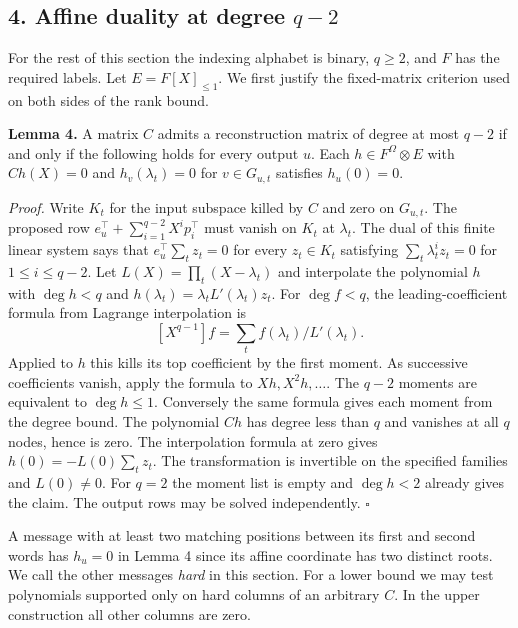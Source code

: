 \documentclass[
  10pt,
]{article}
\begin{document}
\subsection{\texorpdfstring{4. Affine duality at degree
\(q-2\)}{4. Affine duality at degree q-2}}\label{affine-duality-at-degree-q-2}

For the rest of this section the indexing alphabet is binary, \(q\ge2\),
and \(F\) has the required labels. Let \(E=F[X]_{\le1}\). We first
justify the fixed-matrix criterion used on both sides of the rank bound.

\textbf{Lemma 4.} A matrix \(C\) admits a reconstruction matrix of
degree at most \(q-2\) if and only if the following holds for every
output \(u\). Each \(h\in F^\Omega\otimes E\) with \(Ch(X)=0\) and
\(h_v(\lambda_t)=0\) for \(v\in G_{u,t}\) satisfies \(h_u(0)=0\).

\emph{Proof.} Write \(K_t\) for the input subspace killed by \(C\) and
zero on \(G_{u,t}\). The proposed row
\(e_u^\top+\sum_{i=1}^{q-2}X^i p_i^\top\) must vanish on \(K_t\) at
\(\lambda_t\). The dual of this finite linear system says that
\(e_u^\top\sum_t z_t=0\) for every \(z_t\in K_t\) satisfying
\(\sum_t\lambda_t^i z_t=0\) for \(1\le i\le q-2\). Let
\(L(X)=\prod_t(X-\lambda_t)\) and interpolate the polynomial \(h\) with
\(\deg h<q\) and \(h(\lambda_t)=\lambda_tL'(\lambda_t)z_t\). For
\(\deg f<q\), the leading-coefficient formula from Lagrange
interpolation is \[
 [X^{q-1}] f=\sum_t f(\lambda_t)/L'(\lambda_t).
\] Applied to \(h\) this kills its top coefficient by the first moment.
As successive coefficients vanish, apply the formula to
\(Xh,X^2h,\ldots\). The \(q-2\) moments are equivalent to
\(\deg h\le1\). Conversely the same formula gives each moment from the
degree bound. The polynomial \(Ch\) has degree less than \(q\) and
vanishes at all \(q\) nodes, hence is zero. The interpolation formula at
zero gives \(h(0)=-L(0)\sum_t z_t\). The transformation is invertible on
the specified families and \(L(0)\ne0\). For \(q=2\) the moment list is
empty and \(\deg h<2\) already gives the claim. The output rows may be
solved independently. \(\square\)

A message with at least two matching positions between its first and
second words has \(h_u=0\) in Lemma 4 since its affine coordinate has
two distinct roots. We call the other messages \emph{hard} in this
section. For a lower bound we may test polynomials supported only on
hard columns of an arbitrary \(C\). In the upper construction all other
columns are zero.
\end{document}
